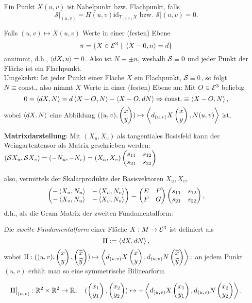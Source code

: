 \begin{remark}
	
	Ein Punkt $X(u,v)$ ist Nabelpunkt bzw. Flachpunkt, falls
	\[ \mathcal{S}\big|_{(u,v)} = H(u,v)\mathrm{id}_{T_{(u,v)}X} \text{ bzw. } \mathcal{S}\big|{(u,v)}=0. \]
	
\end{remark}

\begin{example}
	
	Falls $  (u,v) \mapsto X(u,v) $ Werte in einer (festen) Ebene
		\[ \pi = \{ X \in \mathcal E^3 ~|~ \left \langle X-0,n \right\rangle = d \} \] 
	annimmt, d.h., $ \left \langle dX,n \right\rangle=0 $. Also ist $ N \equiv \pm n $, weshalb $\mathcal S \equiv 0$ und jeder Punkt der Fläche ist ein Flachpunkt.\\
	Umgekehrt: Ist jeder Punkt einer Fläche $ X $ ein Flachpunkt, $ \mathcal S \equiv 0 $, so folgt $ N \equiv \mathrm{const.} $, also nimmt $ X $ Werte in einer (festen) Ebene an: Mit $ O \in \mathcal E^3 $ beliebig \[ 0 = \left \langle dX,N \right\rangle = d\left \langle X-O,N \right\rangle - \left \langle X-O,dN \right\rangle \Rightarrow \mathrm{const.} \equiv \left \langle X-O,N \right\rangle, \] wobei $ \left \langle dX,N \right\rangle $ eine Abbildung $ ((u,v), \begin{pmatrix} x \\ y \end{pmatrix}) \mapsto \left \langle d_{(u,v)}X\begin{pmatrix} x\\y \end{pmatrix},N(u,v) \right\rangle $ ist.

	\textbf{Matrixdarstellung}: Mit $(X_u,X_v)$ als tangentiales Basisfeld kann der Weingartentensor als Matrix geschrieben werden:
	$ (\mathcal S X_u, \mathcal S X_v) = (-N_u, -N_v) = (X_u,X_v) \begin{pmatrix} s_{11} & s_{12} \\ s_{21} & s_{22} \end{pmatrix} $
	
	also, vermittels der Skalarprodukte der Basisvektoren $ X_u,X_v $, 
	\[\begin{pmatrix} -\left \langle X_u,N_u \right\rangle & - \left \langle X_u,N_v \right\rangle \\ - \left \langle X_v,N_u \right\rangle & - \left \langle X_v,N_v \right\rangle  \end{pmatrix} = \begin{pmatrix} E &F \\ F &G \end{pmatrix} \begin{pmatrix} s_{11} & s_{12} \\ s_{21} & s_{22} \end{pmatrix}, \] d.h., als die Gram Matrix der zweiten Fundamentalform:
	
	
\end{example}

\begin{lemma, definition}
	 Die \emph{zweite Fundamentalform} einer Fläche $ X: M \rightarrow \mathcal E^3 $ ist definiert als \[ \mathrm{II} := \left \langle dX,dN \right\rangle, \] wobei $ \mathrm{II}: ((u,v), \begin{pmatrix} x \\ y \end{pmatrix},\begin{pmatrix} \widetilde{x} \\ \widetilde{y} \end{pmatrix}) \mapsto \left \langle d_{(u,v)}X \begin{pmatrix} x\\y \end{pmatrix},d_{(u,v)}N \begin{pmatrix} \widetilde{x}\\\widetilde{y} \end{pmatrix} \right\rangle; $
	 an jedem Punkt $ (u,v) $ erhält man so eine symmetrische Bilinearform 
	 
	 \[ \mathrm{II}\big|_{(u,v)}: \mathbb R^2 \times \mathbb R^2 \rightarrow \mathbb R, \quad (\begin{pmatrix} x_1 \\ y_1 \end{pmatrix},\begin{pmatrix} x_2 \\ y_2 \end{pmatrix}) \mapsto - \left \langle d_{(u,v)}X\begin{pmatrix} x_1 \\ y_1 \end{pmatrix},d_{(u,v)}N\begin{pmatrix} x_2 \\ y_2 \end{pmatrix} \right\rangle. \]
	 
\end{lemma, definition}


